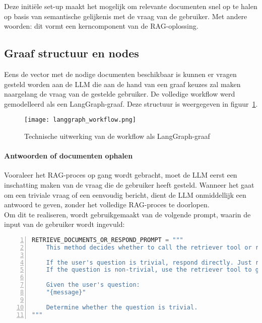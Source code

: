 Deze initiële set-up maakt het mogelijk om relevante documenten snel op te halen op basis van semantische gelijkenis met de vraag van de gebruiker. Met andere woorden: dit vormt een kerncomponent van de RAG-oplossing.

\subsection{Graaf structuur en nodes}

Eens de vector met de nodige documenten beschikbaar is kunnen er vragen gesteld worden aan de LLM die aan de hand van een graaf keuzes zal maken naargelang de vraag van de gestelde gebruiker. De volledige workflow werd gemodelleerd als een LangGraph-graaf. Deze structuur is weergegeven in figuur~\ref{fig:langgraph}.

\begin{figure}[H]
    \centering
    \texttt{[image: langgraph\_workflow.png]}
    \caption{Technische uitwerking van de workflow als LangGraph-graaf}
    \label{fig:langgraph}
\end{figure}

\paragraph{Antwoorden of documenten ophalen}

Vooraleer het RAG-proces op gang wordt gebracht, moet de LLM eerst een inschatting maken van de vraag die de gebruiker heeft gesteld. Wanneer het gaat om een triviale vraag of een eenvoudig bericht, dient de LLM onmiddellijk een antwoord te geven, zonder het volledige RAG-proces te doorlopen.
\\[1em]
Om dit te realiseren, wordt gebruikgemaakt van de volgende prompt, waarin de input van de gebruiker wordt ingevuld: 

\begin{lstlisting}[basicstyle=\small, frame=single, breaklines=true, postbreak=\mbox{\textcolor{red}{$\hookrightarrow$}\space}, escapeinside ={\%,}, escapechar={!}, numbers=left, language=Python, caption=Prompt retrieve or respond]
RETRIEVE_DOCUMENTS_OR_RESPOND_PROMPT = """
    This method decides whether to call the retriever tool or respond directly.
    
    If the user's question is trivial, respond directly. Just respond directly. Do not show your reasoning or thinking process.
    If the question is non-trivial, use the retriever tool to generate a response.
    
    Given the user's question:  
    "{message}"
    
    Determine whether the question is trivial. 
"""
\end{lstlisting}

